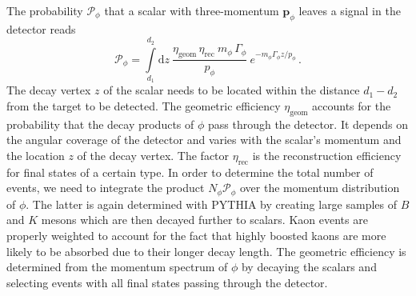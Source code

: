 \documentclass[preprintnumbers,twocolumn,aps,floats,nofootinbib]{revtex4-1}
\newcommand{\D}{\mathrm{d}}
\begin{document}
The probability $\mathcal{P}_\phi$ that a scalar with three-momentum $\mathbf{p}_\phi$ leaves a signal in the detector reads
\begin{equation}
 \mathcal{P}_\phi = \int\limits_{d_1}^{d_2} \!\D z \:\frac{\eta_{\text{geom}}\,\eta_{\text{rec}}\:m_\phi\, \Gamma_\phi}{p_\phi} 
\: e^{-m_\phi \Gamma_\phi z/p_\phi}\,.
\end{equation}
The decay vertex $z$ of the scalar needs to be located within the distance $d_1-d_2$ from the target to be detected. The geometric efficiency $\eta_{\text{geom}}$ accounts for the probability that the decay products of $\phi$ pass through the detector. It depends on the angular coverage of the detector and varies with the scalar's momentum and the location $z$ of the decay vertex. The factor $\eta_{\text{rec}}$ is the reconstruction efficiency for final states of a certain type. In order to determine the total number of events, we need to integrate the product $N_\phi \mathcal{P}_\phi$ over the momentum distribution of $\phi$. The latter is again determined with PYTHIA by creating large samples of $B$ and $K$ mesons which are then decayed further to scalars. Kaon events are properly weighted to account for the fact that highly boosted kaons are more likely to be absorbed due to their longer decay length. The geometric efficiency is determined from the momentum spectrum of $\phi$ by decaying the scalars and selecting events with all final states passing through the detector. 
\end{document}
